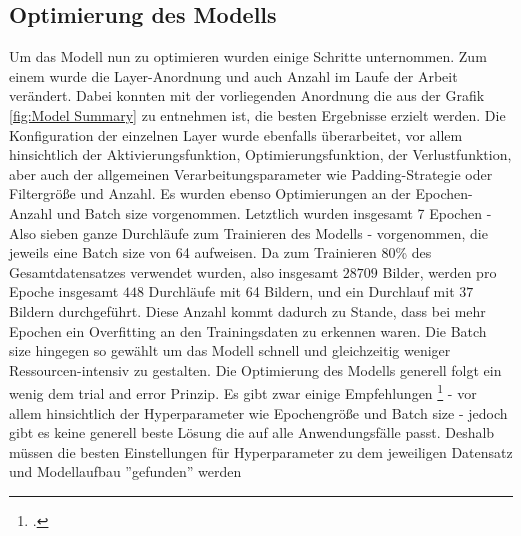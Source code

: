 \documentclass[12pt, a4paper]{report}
\begin{document}
\subsection{Optimierung des Modells}
Um das Modell nun zu optimieren wurden einige Schritte unternommen. Zum einem wurde die Layer-Anordnung und auch Anzahl im Laufe der Arbeit verändert. Dabei konnten mit der vorliegenden Anordnung die aus der Grafik \ref{fig:Model Summary} zu entnehmen ist, die besten Ergebnisse erzielt werden. Die Konfiguration der einzelnen Layer wurde ebenfalls überarbeitet, vor allem hinsichtlich der Aktivierungsfunktion, Optimierungsfunktion, der Verlustfunktion, aber auch der allgemeinen Verarbeitungsparameter wie Padding-Strategie oder Filtergröße und Anzahl. Es wurden ebenso Optimierungen an der Epochen-Anzahl und Batch size vorgenommen. Letztlich wurden insgesamt 7 Epochen - Also sieben ganze Durchläufe zum Trainieren des Modells - vorgenommen, die jeweils eine Batch size von  64 aufweisen. Da zum Trainieren 80\% des Gesamtdatensatzes verwendet wurden, also insgesamt $ 28709 $ Bilder, werden pro Epoche insgesamt $ 448 $ Durchläufe mit 64 Bildern, und ein Durchlauf mit $ 37 $ Bildern durchgeführt. Diese Anzahl kommt dadurch zu Stande, dass bei mehr Epochen ein Overfitting an den Trainingsdaten zu erkennen waren. Die Batch size hingegen so gewählt um das Modell schnell und gleichzeitig weniger Ressourcen-intensiv zu gestalten. Die Optimierung des Modells generell folgt ein wenig dem trial and error Prinzip. Es gibt zwar einige Empfehlungen 
\footcite[Vgl.][]{ModellOptimierung}
 - vor allem hinsichtlich der Hyperparameter wie Epochengröße und Batch size - jedoch gibt es keine generell beste Lösung die auf alle Anwendungsfälle passt. Deshalb müssen die besten Einstellungen für Hyperparameter zu dem jeweiligen Datensatz und Modellaufbau ''gefunden'' werden
\end{document}
